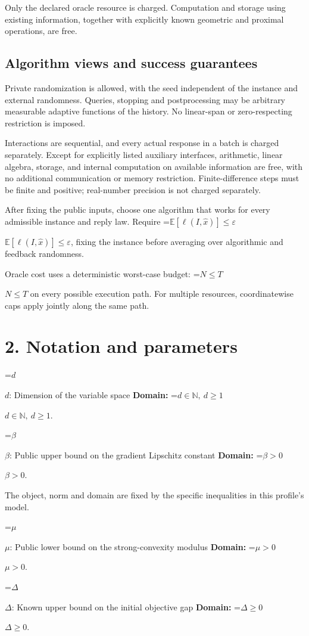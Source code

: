 \documentclass[10pt,a4paper]{article}
\newcommand{\AtlasMath}[1]{\par\begingroup\centering\setbox0=\hbox{$\displaystyle #1$}\ifdim\wd0>1.4\linewidth\typeout{ATLAS WIDE FORMULA: \the\wd0}\fi\ifdim\wd0>\linewidth\resizebox{\linewidth}{!}{\box0}\else\box0\fi\par\endgroup}
\newcommand{\AtlasInlineMath}[1]{\begingroup\setbox0=\hbox{$#1$}\ifdim\wd0>.4\linewidth\endgroup\AtlasMath{#1}\else\endgroup$#1$\fi}
\begin{document}
Only the declared oracle resource is charged. Computation and storage using existing information, together with explicitly known geometric and proximal operations, are free.

\subsection{Algorithm views and success guarantees}
Private randomization is allowed, with the seed independent of the instance and external randomness. Queries, stopping and postprocessing may be arbitrary measurable adaptive functions of the history. No linear-span or zero-respecting restriction is imposed.

Interactions are sequential, and every actual response in a batch is charged separately. Except for explicitly listed auxiliary interfaces, arithmetic, linear algebra, storage, and internal computation on available information are free, with no additional communication or memory restriction. Finite-difference steps must be finite and positive; real-number precision is not charged separately.

After fixing the public inputs, choose one algorithm that works for every admissible instance and reply law. Require \AtlasInlineMath{\mathbb{E}[\ell(I,\widehat{x})]\le \varepsilon}, fixing the instance before averaging over algorithmic and feedback randomness.

Oracle cost uses a deterministic worst-case budget: \AtlasInlineMath{N\le T} on every possible execution path. For multiple resources, coordinatewise caps apply jointly along the same path.

\section{2. Notation and parameters}
\AtlasInlineMath{d}: Dimension of the variable space \textbf{Domain:} \AtlasInlineMath{d\in\mathbb{N},\ d\ge1}.

\AtlasInlineMath{\beta}: Public upper bound on the gradient Lipschitz constant \textbf{Domain:} \AtlasInlineMath{\beta>0}.

The object, norm and domain are fixed by the specific inequalities in this profile's model.

\AtlasInlineMath{\mu}: Public lower bound on the strong-convexity modulus \textbf{Domain:} \AtlasInlineMath{\mu>0}.

\AtlasInlineMath{\Delta}: Known upper bound on the initial objective gap \textbf{Domain:} \AtlasInlineMath{\Delta\ge0}.
\end{document}

